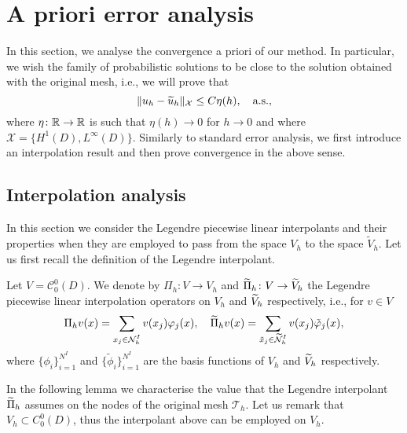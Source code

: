\documentclass[10pt]{article}
\begin{document}
\section{A priori error analysis}

In this section, we analyse the convergence a priori of our method. In particular, we wish the family of probabilistic solutions to be close to the solution obtained with the original mesh, i.e., we will prove that 
\begin{equation}\label{eq:DefProbConv}
	\lVert u_h - \widetilde u_h\rVert_{\mathcal X} \leq C\eta(h), \quad \text{a.s.},
\end{equation}
where $\eta \colon \mathbb{R} \to \mathbb{R}$ is such that $\eta(h) \to 0$ for $h \to 0$ and where $\mathcal X = \{H^1(D), L^\infty(D)\}$. Similarly to standard error analysis, we first introduce an interpolation result and then prove convergence in the above sense.

\subsection{Interpolation analysis}

In this section we consider the Legendre piecewise linear interpolants and their properties when they are employed to pass from the space $V_h$ to the space $\widetilde V_h$. Let us first recall the definition of the Legendre interpolant.

\begin{definition}\label{def:Legendre} Let $V = \mathcal C^0_0(D)$. We denote by $\Pi_h\colon V \to V_h$ and $\widetilde \Pi_h\colon V \to \widetilde V_h$ the Legendre piecewise linear interpolation operators on $V_h$ and $\widetilde V_h$ respectively, i.e., for $v \in V$
	\begin{equation}
	\Pi_h v(x) = \fsum{x_j \in \mathcal N_h^I} v(x_j) \phi_j(x), \quad	\btilde \Pi_h v(x) = \fsum{\tilde x_j \in \btilde {\mathcal N}_h^I} v(x_j) \tilde \phi_j(x),
	\end{equation}
	where $\{\phi_i\}_{i=1}^{N^I}$ and $\{\tilde \phi_i\}_{i=1}^{N^I}$ are the basis functions of $V_h$ and $\widetilde V_h$ respectively.
\end{definition}

In the following lemma we characterise the value that the Legendre interpolant $\widetilde \Pi_h$ assumes on the nodes of the original mesh $\mathcal T_h$. Let us remark that $V_h \subset C_0^0(D)$, thus the interpolant above can be employed on $V_h$.
\end{document}
